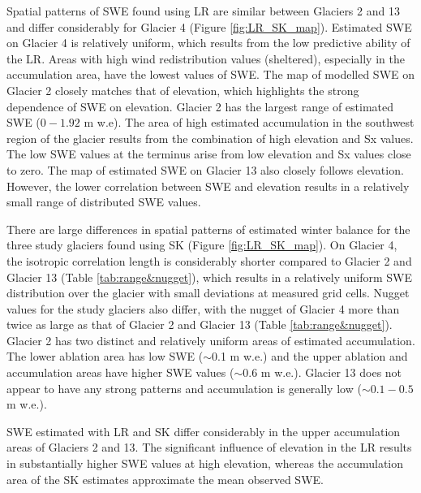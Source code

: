\documentclass[review,oneside, letterpaper]{igs}
\begin{document}
Spatial patterns of SWE found using LR are similar between Glaciers 2 and 13 and differ considerably for Glacier 4 (Figure \ref{fig:LR_SK_map}). Estimated SWE on Glacier 4 is relatively uniform, which results from the low predictive ability of the LR. Areas with high wind redistribution values (sheltered), especially in the accumulation area, have the lowest values of SWE. The map of modelled SWE on Glacier 2 closely matches that of elevation, which highlights the strong dependence of SWE on elevation. Glacier 2 has the largest range of estimated SWE ($0 - 1.92$ m w.e). The area of high estimated accumulation in the southwest region of the glacier  results from the combination of high elevation and Sx values. The low SWE values at the terminus arise from low elevation and Sx values close to zero. The map of estimated SWE on Glacier 13 also closely follows elevation. However, the lower correlation between SWE and elevation results in a relatively small range of distributed SWE values.

There are large differences in spatial patterns of estimated winter balance for the three study glaciers found using SK (Figure \ref{fig:LR_SK_map}). On Glacier 4, the isotropic correlation length is considerably shorter compared to Glacier 2 and Glacier 13 (Table \ref{tab:range&nugget}), which results in a relatively uniform SWE distribution over the glacier with small deviations at measured grid cells. Nugget values for the study glaciers also differ, with the nugget of Glacier 4 more than twice as large as that of Glacier 2 and Glacier 13 (Table \ref{tab:range&nugget}). Glacier 2 has two distinct and relatively uniform areas of estimated accumulation. The lower ablation area has low SWE ($\sim$0.1 m w.e.) and the upper ablation and accumulation areas have higher SWE values ($\sim$0.6 m w.e.). Glacier 13 does not appear to have any strong patterns and accumulation is generally low ($\sim0.1-0.5$ m w.e.).

SWE estimated with LR and SK differ considerably in the upper accumulation areas of Glaciers 2 and 13. The significant influence of elevation in the LR results in substantially higher SWE values at high elevation, whereas the accumulation area of the SK estimates approximate the mean observed SWE. 
\end{document}
